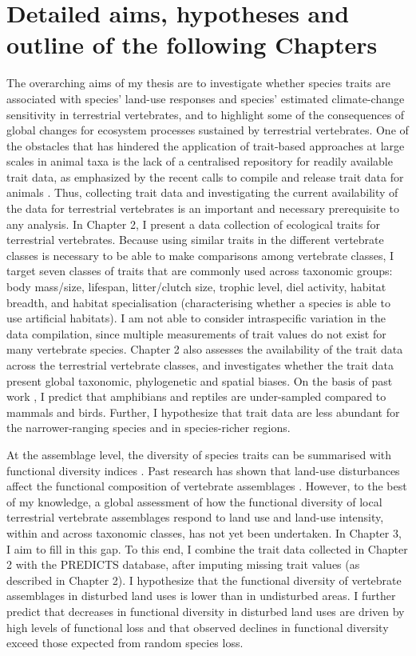 \section{Detailed aims, hypotheses and outline of the following Chapters}

The overarching aims of my thesis are to investigate whether species traits are associated with species' land-use responses and species' estimated climate-change sensitivity in terrestrial vertebrates, and to highlight some of the consequences of global changes for ecosystem processes sustained by terrestrial vertebrates. One of the obstacles that has hindered the application of trait-based approaches at large scales in animal taxa is the lack of a centralised repository for readily available trait data, as emphasized by the recent calls to compile and release trait data for animals \citep{Kissling2018, Junker2022}. Thus, collecting trait data and investigating the current availability of the data for terrestrial vertebrates is an important and necessary prerequisite to any analysis. In Chapter 2, I present  a data collection of ecological traits for terrestrial vertebrates. Because using similar traits in the different vertebrate classes is necessary to be able to make comparisons among vertebrate classes, I target seven classes of traits that are commonly used across taxonomic groups: body mass/size, lifespan, litter/clutch size, trophic level, diel activity, habitat breadth, and habitat specialisation (characterising whether a species is able to use artificial habitats). I am not able to consider intraspecific variation in the data compilation, since multiple measurements of trait values do not exist for many vertebrate species. Chapter 2 also assesses the availability of the trait data across the terrestrial vertebrate classes, and investigates whether the trait data present global taxonomic, phylogenetic and spatial biases. On the basis of past work \citep{Titley2017}, I predict that amphibians and reptiles are under-sampled compared to mammals and birds. Further, I hypothesize that trait data are less abundant for the narrower-ranging species and in species-richer regions. 

At the assemblage level, the diversity of species traits can be summarised with functional diversity indices \citep{Villeger2008, Schleuter2010a, Legras2018}. Past research has shown that land-use disturbances affect the functional composition of vertebrate assemblages \citep{Flynn2009, Tinoco2018}. However, to the best of my knowledge, a global assessment of how the functional diversity of local terrestrial vertebrate assemblages respond to land use and land-use intensity, within and across taxonomic classes, has not yet been undertaken. In Chapter 3, I aim to fill in this gap. To this end, I combine the trait data collected in Chapter 2 with the PREDICTS database, after imputing missing trait values (as described in Chapter 2). I hypothesize that the functional diversity of vertebrate assemblages in disturbed land uses is lower than in undisturbed areas. I further predict that decreases in functional diversity in disturbed land uses are driven by high levels of functional loss and that observed declines in functional diversity exceed those expected from random species loss. 

